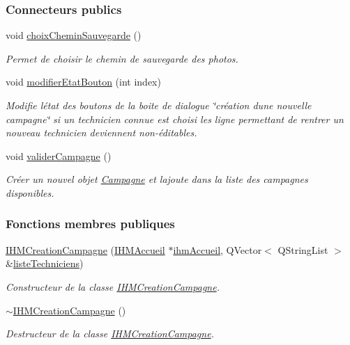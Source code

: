 \subsubsection*{Connecteurs publics}
\begin{DoxyCompactItemize}
\item 
void \hyperlink{class_i_h_m_creation_campagne_aceedbe44750998444120ae6343bbdcc6}{choix\+Chemin\+Sauvegarde} ()
\begin{DoxyCompactList}\small\item\em Permet de choisir le chemin de sauvegarde des photos. \end{DoxyCompactList}\item 
void \hyperlink{class_i_h_m_creation_campagne_a93395fef027960e7ab0d5c75a76e7414}{modifier\+Etat\+Bouton} (int index)
\begin{DoxyCompactList}\small\item\em Modifie l\textquotesingle{}état des boutons de la boite de dialogue \char`\"{}création d\textquotesingle{}une nouvelle campagne\char`\"{} si un technicien connue est choisi les ligne permettant de rentrer un nouveau technicien deviennent non-\/éditables. \end{DoxyCompactList}\item 
void \hyperlink{class_i_h_m_creation_campagne_ad5c63453b1b8d1099a43ff3522244072}{valider\+Campagne} ()
\begin{DoxyCompactList}\small\item\em Créer un nouvel objet \hyperlink{class_campagne}{Campagne} et l\textquotesingle{}ajoute dans la liste des campagnes disponibles. \end{DoxyCompactList}\end{DoxyCompactItemize}
\subsubsection*{Fonctions membres publiques}
\begin{DoxyCompactItemize}
\item 
\hyperlink{class_i_h_m_creation_campagne_a0e9cce2b950a638f1bf012b79d05eb9c}{I\+H\+M\+Creation\+Campagne} (\hyperlink{class_i_h_m_accueil}{I\+H\+M\+Accueil} $\ast$\hyperlink{class_i_h_m_creation_campagne_a6b5ea4a52138016a07a37060669288ae}{ihm\+Accueil}, Q\+Vector$<$ Q\+String\+List $>$ \&\hyperlink{class_i_h_m_creation_campagne_aee78d20f0263359283cbcbc50fac3143}{liste\+Techniciens})
\begin{DoxyCompactList}\small\item\em Constructeur de la classe \hyperlink{class_i_h_m_creation_campagne}{I\+H\+M\+Creation\+Campagne}. \end{DoxyCompactList}\item 
\hyperlink{class_i_h_m_creation_campagne_af2f85377637b15ccb2215b4b1f96b574}{$\sim$\+I\+H\+M\+Creation\+Campagne} ()
\begin{DoxyCompactList}\small\item\em Destructeur de la classe \hyperlink{class_i_h_m_creation_campagne}{I\+H\+M\+Creation\+Campagne}. \end{DoxyCompactList}\end{DoxyCompactItemize}
